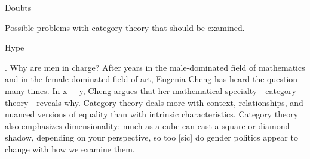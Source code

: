 \begin{plSection}{Doubts}
\label{sec:Doubts}

Possible problems with category theory that should be examined.

\begin{plSection}{Hype}
\label{sec:Hype}

\begin{plQuote}
{.}
{}
Why are men in charge? 
After years in the male-dominated field of mathematics 
and in the female-dominated field of art, 
Eugenia Cheng has heard the question many times. 
In x + y, Cheng argues that her mathematical 
specialty---category theory---reveals why. 
Category theory deals more with context, relationships, 
and nuanced versions of equality than 
with intrinsic characteristics. 
Category theory also emphasizes dimensionality: 
much as a cube can cast a square or diamond shadow, 
depending on your perspective, 
so too [sic] do gender politics appear to change 
with how we examine them. 
\end{plQuote}


\end{plSection}
\end{plSection}

